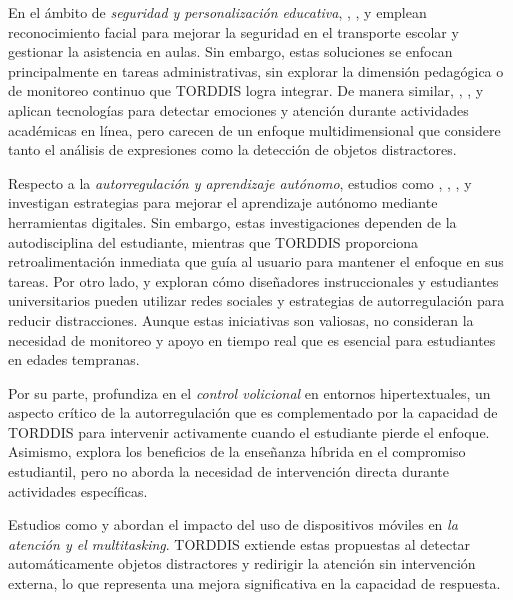\documentclass[a4paper,fleqn]{cas-sc}
\begin{document}
	En el ámbito de \textit{seguridad y personalización educativa}, \cite{Hachad2020}, \cite{James2019}, \cite{DaCosta2023} y \cite{Boumiza2017} emplean reconocimiento facial para mejorar la seguridad en el transporte escolar y gestionar la asistencia en aulas. Sin embargo, estas soluciones se enfocan principalmente en tareas administrativas, sin explorar la dimensión pedagógica o de monitoreo continuo que TORDDIS logra integrar. De manera similar, \cite{Kulkarni2023}, \cite{Narkhede2023}, \cite{Kumar2024Zoom} y \cite{Ozdamli2022} aplican tecnologías para detectar emociones y atención durante actividades académicas en línea, pero carecen de un enfoque multidimensional que considere tanto el análisis de expresiones como la detección de objetos distractores.
	
	Respecto a la \textit{autorregulación y aprendizaje autónomo}, estudios como \cite{Bembich2016Future}, \cite{Roberts2020Task}, \cite{Adcroft2018Developing}, y \cite{Salter2014Exploring} investigan estrategias para mejorar el aprendizaje autónomo mediante herramientas digitales. Sin embargo, estas investigaciones dependen de la autodisciplina del estudiante, mientras que TORDDIS proporciona retroalimentación inmediata que guía al usuario para mantener el enfoque en sus tareas. Por otro lado, \cite{Muljana2022Instructional} y \cite{Wang2022Empowering} exploran cómo diseñadores instruccionales y estudiantes universitarios pueden utilizar redes sociales y estrategias de autorregulación para reducir distracciones. Aunque estas iniciativas son valiosas, no consideran la necesidad de monitoreo y apoyo en tiempo real que es esencial para estudiantes en edades tempranas.
	
	Por su parte, \cite{Peters2003Self} profundiza en el \textit{control volicional} en entornos hipertextuales, un aspecto crítico de la autorregulación que es complementado por la capacidad de TORDDIS para intervenir activamente cuando el estudiante pierde el enfoque. Asimismo, \cite{Palmer2022impact} explora los beneficios de la enseñanza híbrida en el compromiso estudiantil, pero no aborda la necesidad de intervención directa durante actividades específicas.
	
	Estudios como \cite{Hartley2022Smartphone} y \cite{Labar2019Interplay} abordan el impacto del uso de dispositivos móviles en \textit{la atención y el multitasking}. TORDDIS extiende estas propuestas al detectar automáticamente objetos distractores y redirigir la atención sin intervención externa, lo que representa una mejora significativa en la capacidad de respuesta.
	
\end{document}
